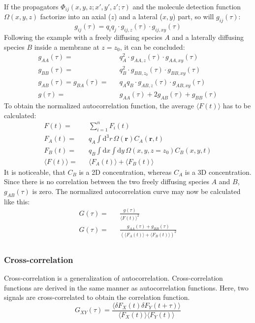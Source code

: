 	If the propagators $\Phi_{ij}(x,y,z; x',y',z'; \tau)$ and the molecule detection function $\Omega(x,y,z)$ factorize into an axial ($z$) and a lateral ($x,y$) part, so will $g_{ij}(\tau)$:
	\begin{equation}
	g_{ij}(\tau) = q_i q_j \cdot g_{ij,z}(\tau) \cdot g_{ij,xy}(\tau)
	\end{equation}
	Following the example with a freely diffusing species $A$ and a laterally diffusing species $B$ inside a membrane at $z = z_0$, it can be concluded:
	\begin{eqnarray*}
	g_{AA}(\tau) = && q_A^2 \cdot g_{AA,z}(\tau) \cdot g_{AA,xy}(\tau) \\
	g_{BB}(\tau) = && q_B^2 \cdot g_{BB,z_0}(\tau) \cdot g_{BB,xy}(\tau) \\
	g_{AB}(\tau) = g_{BA} (\tau) = && q_A q_B \cdot g_{AB,z}(\tau) \cdot g_{AB,xy}(\tau)  \\
	g(\tau) = && g_{AA}(\tau) + 2 g_{AB}(\tau) + g_{BB}(\tau)
	\end{eqnarray*}
	To obtain the normalized autocorrelation function, the average $\langle F(t) \rangle$ has to be calculated:
	\begin{eqnarray*}
	F(t) = && \sum_{i=1}^n F_i(t) \\
	F_A(t) = && q_A \int \! \mathrm{d}^3 r \, \Omega(\mathbf{r}) C_A(\mathbf{r}, t) \\
	F_B(t) = && q_B \int \! \mathrm{d}x \! \int \! \mathrm{d}y \, \Omega(x,y,z=z_0) C_B(x,y, t)  \\
	\langle F(t) \rangle = && \langle F_A(t) \rangle + \langle F_B(t) \rangle
	\end{eqnarray*}
	It is noticeable, that $C_B$ is a 2D concentration, whereas $C_A$ is a 3D concentration. Since there is no correlation between the two freely diffusing species $A$ and $B$, $g_{AB}(\tau)$ is zero. The normalized autocorrelation curve may now be calculated like this:
	\begin{eqnarray*}
	G(\tau) = && \frac{g(\tau)}{\langle F(t) \rangle^2} \\
	G(\tau) = && \frac{g_{AA}(\tau) + g_{BB}(\tau)}{(\langle F_A(t) \rangle + \langle F_B(t) \rangle)^2} \\
	\end{eqnarray*}

	\subsubsection{Cross-correlation}
	Cross-correlation is a generalization of autocorrelation. Cross-correlation functions are derived in the same manner as autocorrelation functions. Here, two signals are cross-correlated to obtain the correlation function.
	\begin{equation}
	G_{XY}(\tau) = \frac{\langle \delta F_X(t) \delta F_Y(t+\tau) \rangle}{\langle F_X(t) \rangle \langle F_Y(t) \rangle}
	\end{equation}
	
